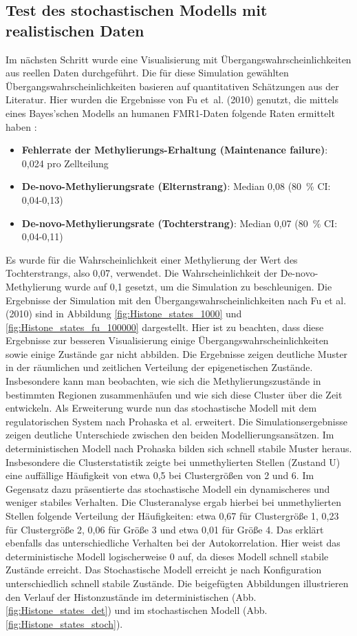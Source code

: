 \documentclass{SeminarV2}
\begin{document}
\begin{itemize}
\section{Test des stochastischen Modells mit realistischen Daten}
Im n\"{a}chsten Schritt wurde eine Visualisierung mit \"{U}bergangswahrscheinlichkeiten aus reellen Daten durchgef\"{u}hrt. Die f\"{u}r diese Simulation gew\"{a}hlten \"{U}bergangswahrscheinlichkeiten basieren auf quantitativen Sch\"{a}tzungen aus der Literatur.  
Hier wurden die Ergebnisse von Fu et al. (2010) genutzt, die mittels eines Bayes'schen Modells an humanen FMR1-Daten folgende Raten ermittelt haben \cite{fu-2010}:
\begin{itemize}
  \item \textbf{Fehlerrate der Methylierungs-Erhaltung (Maintenance failure)}: 0{,}024 pro Zellteilung  
  \item \textbf{De-novo-Methylierungsrate (Elternstrang)}: Median 0{,}08 (80 \% CI: 0,04-0,13)  
  \item \textbf{De-novo-Methylierungsrate (Tochterstrang)}: Median 0{,}07 (80 \% CI: 0,04-0,11)  
\end{itemize}
Es wurde für die Wahrscheinlichkeit einer Methylierung der Wert des Tochterstrangs,
also 0,07, verwendet. Die Wahrscheinlichkeit der De-novo-Methylierung wurde auf 0,1 gesetzt, um die Simulation zu beschleunigen. Die Ergebnisse der Simulation mit den \"{U}bergangswahrscheinlichkeiten nach Fu et al. (2010) sind in Abbildung \ref{fig:Histone_states_1000} und \ref{fig:Histone_states_fu_100000} dargestellt.
Hier ist zu beachten, dass diese Ergebnisse zur besseren Visualisierung einige Übergangswahrscheinlichkeiten sowie einige Zustände gar nicht abbilden.
Die Ergebnisse zeigen deutliche Muster in der r\"{a}umlichen und zeitlichen 
Verteilung der epigenetischen Zust\"{a}nde. Insbesondere kann man beobachten, wie sich die Methylierungszust\"{a}nde in bestimmten Regionen zusammenh\"{a}ufen und wie sich diese Cluster \"{u}ber die Zeit entwickeln.
Als Erweiterung wurde nun das stochastische Modell mit dem regulatorischen System nach Prohaska et al. erweitert.
Die Simulationsergebnisse zeigen deutliche Unterschiede zwischen den beiden Modellierungsansätzen. Im deterministischen Modell nach Prohaska bilden sich schnell stabile Muster heraus. Insbesondere die Clusterstatistik zeigte bei unmethylierten Stellen (Zustand U) eine auffällige Häufigkeit von etwa 0,5 bei Clustergrößen von 2 und 6.
Im Gegensatz dazu präsentierte das stochastische Modell ein dynamischeres und weniger stabiles Verhalten. Die Clusteranalyse ergab hierbei bei unmethylierten Stellen folgende Verteilung der Häufigkeiten: etwa 0,67 für Clustergröße 1, 0,23 für Clustergröße 2, 0,06 für Größe 3 und etwa 0,01 für Größe 4.
Das erklärt ebenfalls das unterschiedliche Verhalten bei der Autokorrelation. Hier weist das deterministische Modell logischerweise 0 auf, da dieses Modell schnell stabile Zustände erreicht. Das Stochastische Modell erreicht je nach Konfiguration unterschiedlich schnell stabile Zustände.
Die beigefügten Abbildungen illustrieren den Verlauf der Histonzustände im deterministischen (Abb. \ref{fig:Histone_states_det}) und im stochastischen Modell (Abb. \ref{fig:Histone_states_stoch}).


\end{itemize}
\end{document}
